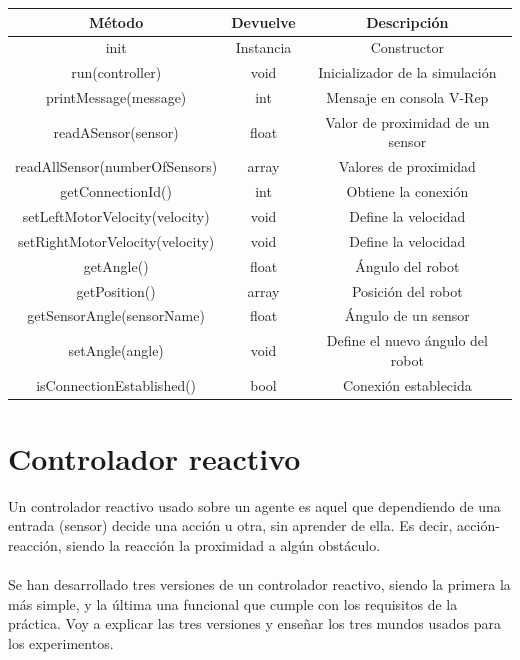 \documentclass[14pt]{extarticle}
\theoremstyle{definition}
\theoremstyle{remark}
\begin{document}
\begin{tabular}{|c|c|c|}
\hline 
Método & Devuelve & Descripción \\ 
\hline 
init & Instancia & Constructor \\ 
\hline 
run(controller) & void & Inicializador de la simulación \\ 
\hline 
printMessage(message) & int & Mensaje en consola V-Rep \\ 
\hline 
readASensor(sensor) & float & Valor de proximidad de un sensor \\ 
\hline 
readAllSensor(numberOfSensors) & array & Valores de proximidad \\ 
\hline 
getConnectionId() & int & Obtiene la conexión \\ 
\hline 
setLeftMotorVelocity(velocity) & void & Define la velocidad \\ 
\hline 
setRightMotorVelocity(velocity) & void & Define la velocidad \\ 
\hline 
getAngle() & float & Ángulo del robot \\ 
\hline 
getPosition() & array & Posición del robot \\ 
\hline 
getSensorAngle(sensorName) & float & Ángulo de un sensor \\ 
\hline 
setAngle(angle) & void & Define el nuevo ángulo del robot \\ 
\hline 
isConnectionEstablished() & bool & Conexión establecida \\ 
\hline 
\end{tabular} 
\newpage
\section{Controlador reactivo}\label{sec:controladorreactivo}
Un controlador reactivo usado sobre un agente es aquel que dependiendo de una entrada (sensor) decide una acción u otra, sin aprender de ella. Es decir, acción-reacción, siendo la reacción la proximidad a algún obstáculo.\\\\
Se han desarrollado tres versiones de un controlador reactivo, siendo la primera la más simple, y la última una funcional que cumple con los requisitos de la práctica. Voy a explicar las tres versiones y enseñar los tres mundos usados para los experimentos.
\end{document}

